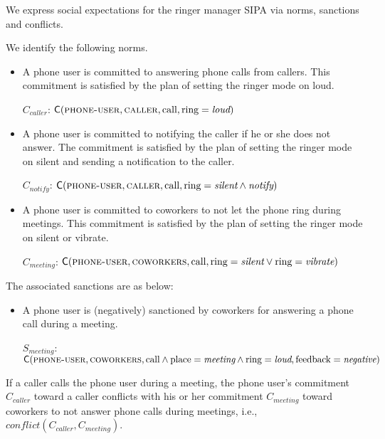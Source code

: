 \documentclass[11pt,          %
               phd,           %
               onehalfspacing %
               ]{ncsuthesis}
\newcommand{\fsc}{\textsc}
\newcommand{\msf}{\mathsf}
\newcommand{\C}{\msf{C}}
\begin{document}
We express social expectations for the ringer manager SIPA via norms,
sanctions and conflicts.
\begin{description}[leftmargin=1em]
\item[Norms.] We identify the following norms.
  \begin{itemize}[leftmargin=1em]
  \item A phone user is committed to answering phone calls from
  callers. This commitment is satisfied by the plan of setting the 
  ringer mode on loud.

  $C_{caller}$: $\C(\fsc{phone-user},\fsc{caller}, \text{call}, \text{ring}=\textit{loud})$

  \item A phone user is committed to notifying the caller if he or she does
  not answer. The commitment is satisfied by the plan of setting the
  ringer mode on silent and sending a notification to the caller.
  
  $C_{notify}$: $\C(\fsc{phone-user},\fsc{caller}, \text{call},\\ 
  \text{ring}= \textit{silent}   \land \textit{notify})$
    
  \item A phone user is committed to coworkers to not let the phone ring 
  during meetings.
  This commitment is satisfied by the plan of setting the ringer mode on 
  silent or vibrate. 

  $C_{meeting}$: $\C(\fsc{phone-user},\fsc{coworkers}, \text{call},\\ 
  \text{ring}= \textit{silent} \lor \text{ring} = \textit{vibrate})$
  \end{itemize}
  
\item[Sanctions.] The associated sanctions are as below: 
  \begin{itemize}[leftmargin=1em]
  \item A phone user is (negatively) sanctioned by coworkers for 
  answering a phone call during a meeting. 
  
    $S_{meeting}$: $\C(\fsc{phone-user},\fsc{coworkers}, \text{call} \\
    \land \text{place}=\textit{meeting} \land \text{ring}=\textit{loud}, \text{feedback}=\textit{negative})$
  \end{itemize}
  
  \item[Conflicts.] If a caller calls the phone user during a meeting, the phone 
  user's commitment $C_{caller}$ toward a caller conflicts with his or her 
  commitment $C_{meeting}$ toward coworkers to not answer phone calls 
  during meetings, i.e., \\$\mathit{conflict}(C_{caller}, C_{meeting})$.
    
\end{description}
\end{document}
